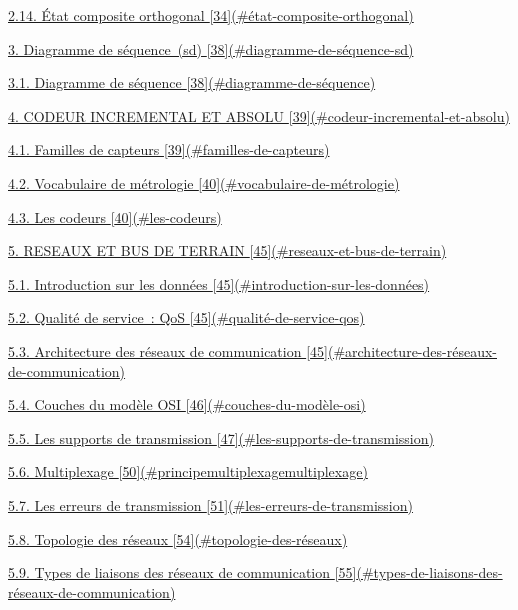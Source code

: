 \protect\hyperlink{uxe9tat-composite-orthogonal}{2.14. État composite orthogonal {[}34{]}(\#état-composite-orthogonal)}

\protect\hyperlink{diagramme-de-suxe9quence-sd}{3. Diagramme de séquence~(sd) {[}38{]}(\#diagramme-de-séquence-sd)}

\protect\hyperlink{diagramme-de-suxe9quence}{3.1. Diagramme de séquence {[}38{]}(\#diagramme-de-séquence)}

\protect\hyperlink{codeur-incremental-et-absolu}{4. CODEUR INCREMENTAL ET ABSOLU {[}39{]}(\#codeur-incremental-et-absolu)}

\protect\hyperlink{familles-de-capteurs}{4.1. Familles de capteurs {[}39{]}(\#familles-de-capteurs)}

\protect\hyperlink{vocabulaire-de-muxe9trologie}{4.2. Vocabulaire de métrologie {[}40{]}(\#vocabulaire-de-métrologie)}

\protect\hyperlink{les-codeurs}{4.3. Les codeurs {[}40{]}(\#les-codeurs)}

\protect\hyperlink{reseaux-et-bus-de-terrain}{5. RESEAUX ET BUS DE TERRAIN {[}45{]}(\#reseaux-et-bus-de-terrain)}

\protect\hyperlink{introduction-sur-les-donnuxe9es}{5.1. Introduction sur les données {[}45{]}(\#introduction-sur-les-données)}

\protect\hyperlink{qualituxe9-de-service-qos}{5.2. Qualité de service~: QoS {[}45{]}(\#qualité-de-service-qos)}

\protect\hyperlink{architecture-des-ruxe9seaux-de-communication}{5.3. Architecture des réseaux de communication {[}45{]}(\#architecture-des-réseaux-de-communication)}

\protect\hyperlink{couches-du-moduxe8le-osi}{5.4. Couches du modèle OSI {[}46{]}(\#couches-du-modèle-osi)}

\protect\hyperlink{les-supports-de-transmission}{5.5. Les supports de transmission {[}47{]}(\#les-supports-de-transmission)}

\protect\hyperlink{principemultiplexagemultiplexage}{5.6. Multiplexage {[}50{]}(\#principemultiplexagemultiplexage)}

\protect\hyperlink{les-erreurs-de-transmission}{5.7. Les erreurs de transmission {[}51{]}(\#les-erreurs-de-transmission)}

\protect\hyperlink{topologie-des-ruxe9seaux}{5.8. Topologie des réseaux {[}54{]}(\#topologie-des-réseaux)}

\protect\hyperlink{types-de-liaisons-des-ruxe9seaux-de-communication}{5.9. Types de liaisons des réseaux de communication {[}55{]}(\#types-de-liaisons-des-réseaux-de-communication)}


